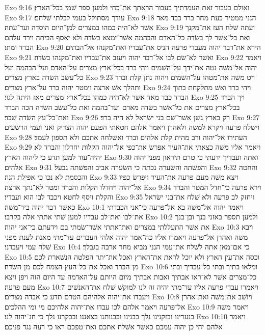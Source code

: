 Exo 9:16  ואולם בעבור זאת העמדתיך בעבור הראתך את־כחי ולמען ספר שׁמי בכל־הארץ׃
Exo 9:17  עודך מסתולל בעמי לבלתי שׁלחם׃
Exo 9:18  הנני ממטיר כעת מחר ברד כבד מאד אשׁר לא־היה כמהו במצרים למן־היום הוסדה ועד־עתה׃
Exo 9:19  ועתה שׁלח העז את־מקנך ואת כל־אשׁר לך בשׂדה כל־האדם והבהמה אשׁר־ימצא בשׂדה ולא יאסף הביתה וירד עלהם הברד ומתו׃
Exo 9:20  הירא את־דבר יהוה מעבדי פרעה הניס את־עבדיו ואת־מקנהו אל־הבתים׃
Exo 9:21  ואשׁר לא־שׂם לבו אל־דבר יהוה ויעזב את־עבדיו ואת־מקנהו בשׂדה׃
Exo 9:22  ויאמר יהוה אל־משׁה נטה את־ידך על־השׁמים ויהי ברד בכל־ארץ מצרים על־האדם ועל־הבהמה ועל כל־עשׂב השׂדה בארץ מצרים׃
Exo 9:23  ויט משׁה את־מטהו על־השׁמים ויהוה נתן קלת וברד ותהלך אשׁ ארצה וימטר יהוה ברד על־ארץ מצרים׃
Exo 9:24  ויהי ברד ואשׁ מתלקחת בתוך הברד כבד מאד אשׁר לא־היה כמהו בכל־ארץ מצרים מאז היתה לגוי׃
Exo 9:25  ויך הברד בכל־ארץ מצרים את כל־אשׁר בשׂדה מאדם ועד־בהמה ואת כל־עשׂב השׂדה הכה הברד ואת־כל־עץ השׂדה שׁבר׃
Exo 9:26  רק בארץ גשׁן אשׁר־שׁם בני ישׂראל לא היה ברד׃
Exo 9:27  וישׁלח פרעה ויקרא למשׁה ולאהרן ויאמר אלהם חטאתי הפעם יהוה הצדיק ואני ועמי הרשׁעים׃
Exo 9:28  העתירו אל־יהוה ורב מהית קלת אלהים וברד ואשׁלחה אתכם ולא תספון לעמד׃
Exo 9:29  ויאמר אליו משׁה כצאתי את־העיר אפרשׂ את־כפי אל־יהוה הקלות יחדלון והברד לא יהיה־עוד למען תדע כי ליהוה הארץ׃
Exo 9:30  ואתה ועבדיך ידעתי כי טרם תיראון מפני יהוה אלהים׃
Exo 9:31  והפשׁתה והשׂערה נכתה כי השׂערה אביב והפשׁתה גבעל׃
Exo 9:32  והחטה והכסמת לא נכו כי אפילת הנה׃
Exo 9:33  ויצא משׁה מעם פרעה את־העיר ויפרשׂ כפיו אל־יהוה ויחדלו הקלות והברד ומטר לא־נתך ארצה׃
Exo 9:34  וירא פרעה כי־חדל המטר והברד והקלת ויסף לחטא ויכבד לבו הוא ועבדיו׃
Exo 9:35  ויחזק לב פרעה ולא שׁלח את־בני ישׂראל כאשׁר דבר יהוה ביד־משׁה׃
Exo 10:1  ויאמר יהוה אל־משׁה בא אל־פרעה כי־אני הכבדתי את־לבו ואת־לב עבדיו למען שׁתי אתתי אלה בקרבו׃
Exo 10:2  ולמען תספר באזני בנך ובן־בנך את אשׁר התעללתי במצרים ואת־אתתי אשׁר־שׂמתי בם וידעתם כי־אני יהוה׃
Exo 10:3  ויבא משׁה ואהרן אל־פרעה ויאמרו אליו כה־אמר יהוה אלהי העברים עד־מתי מאנת לענת מפני שׁלח עמי ויעבדני׃
Exo 10:4  כי אם־מאן אתה לשׁלח את־עמי הנני מביא מחר ארבה בגבלך׃
Exo 10:5  וכסה את־עין הארץ ולא יוכל לראת את־הארץ ואכל את־יתר הפלטה הנשׁארת לכם מן־הברד ואכל את־כל־העץ הצמח לכם מן־השׂדה׃
Exo 10:6  ומלאו בתיך ובתי כל־עבדיך ובתי כל־מצרים אשׁר לא־ראו אבתיך ואבות אבתיך מיום היותם על־האדמה עד היום הזה ויפן ויצא מעם פרעה׃
Exo 10:7  ויאמרו עבדי פרעה אליו עד־מתי יהיה זה לנו למוקשׁ שׁלח את־האנשׁים ויעבדו את־יהוה אלהיהם הטרם תדע כי אבדה מצרים׃
Exo 10:8  ויושׁב את־משׁה ואת־אהרן אל־פרעה ויאמר אלהם לכו עבדו את־יהוה אלהיכם מי ומי ההלכים׃
Exo 10:9  ויאמר משׁה בנערינו ובזקנינו נלך בבנינו ובבנותנו בצאננו ובבקרנו נלך כי חג־יהוה לנו׃
Exo 10:10  ויאמר אלהם יהי כן יהוה עמכם כאשׁר אשׁלח אתכם ואת־טפכם ראו כי רעה נגד פניכם׃
